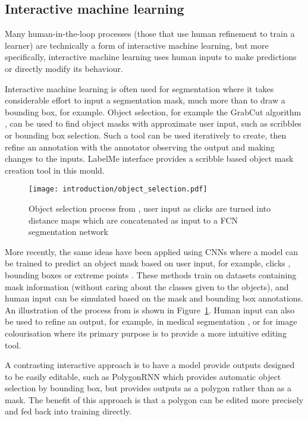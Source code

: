 \subsection{Interactive machine learning}

Many human-in-the-loop processes (those that use human refinement to train a learner) are technically a form of interactive machine learning, but more specifically, interactive machine learning uses human inputs to make predictions or directly modify its behaviour.

Interactive machine learning is often used for segmentation where it takes considerable effort to input a segmentation mask, much more than to draw a bounding box, for example. Object selection, for example the GrabCut algorithm \cite{Rother2004}, can be used to find object masks with approximate user input, such as scribbles or bounding box selection. Such a tool can be used iteratively to create, then refine an annotation with the annotator observing the output and making changes to the inputs.  LabelMe \cite{Russell2007} interface provides a scribble based object mask creation tool in this mould. 

\begin{figure}[h]
  \centering
  \texttt{[image: introduction/object\_selection.pdf]}
  \caption{Object selection process from \cite{Xu2016}, user input as clicks are turned into distance maps which are concatenated as input to a \gls{FCN} segmentation network}  
  \label{fig:object_selection}
\end{figure}
 
More recently, the same ideas have been applied using \gls{CNN}s where a model can be trained to predict an object mask based on user input, for example, clicks \cite{Xu2016, Boroujerdi2017}, bounding boxes \cite {Xu2017} or extreme points \cite{Maninis2017}. These methods train on datasets containing mask information (without caring about the classes given to the objects), and human input can be simulated based on the mask and bounding box annotations. An illustration of the process from \cite{Xu2016} is shown in Figure~\ref{fig:object_selection}. Human input can also be used to refine an output, for example, in medical segmentation \cite{Wang2017}, or for image colourisation \cite{Zhang} where its primary purpose is to provide a more intuitive editing tool.

A contrasting interactive approach is to have a model provide outputs designed to be easily editable, such as PolygonRNN \cite{Castrejon2017} which provides automatic object selection by bounding box, but provides outputs as a polygon rather than as a mask. The benefit of this approach is that a polygon can be edited more precisely and fed back into training directly.


